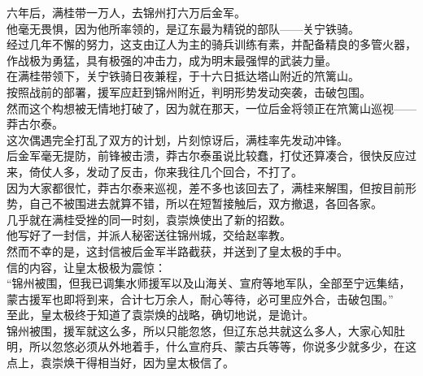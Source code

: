\begin{multicols}{\theparacolNo}
六年后，满桂带一万人，去锦州打六万后金军。\\

他毫无畏惧，因为他所率领的，是辽东最为精锐的部队——关宁铁骑。\\

经过几年不懈的努力，这支由辽人为主的骑兵训练有素，并配备精良的多管火器，作战极为勇猛，具有极强的冲击力，成为明末最强悍的武装力量。\\

在满桂带领下，关宁铁骑日夜兼程，于十六日抵达塔山附近的笊篱山。\\

按照战前的部署，援军应赶到锦州附近，判明形势发动突袭，击破包围。\\

然而这个构想被无情地打破了，因为就在那天，一位后金将领正在笊篱山巡视——莽古尔泰。\\

这次偶遇完全打乱了双方的计划，片刻惊讶后，满桂率先发动冲锋。\\

后金军毫无提防，前锋被击溃，莽古尔泰虽说比较蠢，打仗还算凑合，很快反应过来，倚仗人多，发动了反击，你来我往几个回合，不打了。\\

因为大家都很忙，莽古尔泰来巡视，差不多也该回去了，满桂来解围，但按目前形势，自己不被围进去就算不错，所以在短暂接触后，双方撤退，各回各家。\\

几乎就在满桂受挫的同一时刻，袁崇焕使出了新的招数。\\

他写好了一封信，并派人秘密送往锦州城，交给赵率教。\\

然而不幸的是，这封信被后金军半路截获，并送到了皇太极的手中。\\

信的内容，让皇太极极为震惊：\\

“锦州被围，但我已调集水师援军以及山海关、宣府等地军队，全部至宁远集结，蒙古援军也即将到来，合计七万余人，耐心等待，必可里应外合，击破包围。”\\

至此，皇太极终于知道了袁崇焕的战略，确切地说，是诡计。\\

锦州被围，援军就这么多，所以只能忽悠，但辽东总共就这么多人，大家心知肚明，所以忽悠必须从外地着手，什么宣府兵、蒙古兵等等，你说多少就多少，在这点上，袁崇焕干得相当好，因为皇太极信了。\\


\end{multicols}

